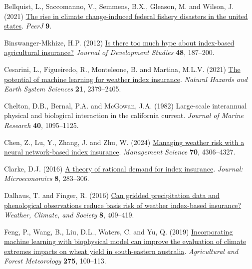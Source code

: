 \documentclass[
  letterpaper,
  DIV=11,
  numbers=noendperiod]{scrartcl}
\newlength{\cslhangindent}
\newlength{\cslentryspacingunit} %
\newenvironment{CSLReferences}[2] %
 {%
  \setlength{\parindent}{0pt}
  \ifodd #1
  \let\oldpar\par
  \def\par{\hangindent=\cslhangindent\oldpar}
  \fi
  \setlength{\parskip}{#2\cslentryspacingunit}
 }%
 {}
\begin{document}
\hypertarget{refs}{}
\begin{CSLReferences}{1}{0}
\leavevmode{}%
Bellquist, L., Saccomanno, V., Semmens, B.X., Gleason, M. and Wilson, J.
(2021) \href{https://doi.org/10.7717/peerj.11186}{The rise in climate
change-induced federal fishery disasters in the united states}.
\emph{PeerJ} \textbf{9}.

\leavevmode{}%
Binswanger-Mkhize, H.P. (2012)
\href{https://doi.org/10.1080/00220388.2011.625411}{Is there too much
hype about index-based agricultural insurance?} \emph{Journal of
Development Studies} \textbf{48}, 187--200.

\leavevmode{}%
Cesarini, L., Figueiredo, R., Monteleone, B. and Martina, M.L.V. (2021)
\href{https://doi.org/10.5194/nhess-21-2379-2021}{The potential of
machine learning for weather index insurance}. \emph{Natural Hazards and
Earth System Sciences} \textbf{21}, 2379--2405.

\leavevmode{}%
Chelton, D.B., Bernal, P.A. and McGowan, J.A. (1982) Large-scale
interannual physical and biological interaction in the california
current. \emph{Journal of Marine Research} \textbf{40}, 1095--1125.

\leavevmode{}%
Chen, Z., Lu, Y., Zhang, J. and Zhu, W. (2024)
\href{https://doi.org/10.1287/mnsc.2023.4902}{Managing weather risk with
a neural network-based index insurance}. \emph{Management Science}
\textbf{70}, 4306--4327.

\leavevmode{}%
Clarke, D.J. (2016) \href{https://doi.org/10.1257/mic.20140103}{A theory
of rational demand for index insurance}. \emph{Journal: Microeconomics}
\textbf{8}, 283--306.

\leavevmode{}%
Dalhaus, T. and Finger, R. (2016)
\href{https://doi.org/10.1175/WCAS-D-16-0020.1}{Can gridded
precipitation data and phenological observations reduce basis risk of
weather index-based insurance?} \emph{Weather, Climate, and Society}
\textbf{8}, 409--419.

\leavevmode{}%
Feng, P., Wang, B., Liu, D.L., Waters, C. and Yu, Q. (2019)
\href{https://doi.org/10.1016/j.agrformet.2019.05.018}{Incorporating
machine learning with biophysical model can improve the evaluation of
climate extremes impacts on wheat yield in south-eastern australia}.
\emph{Agricultural and Forest Meteorology} \textbf{275}, 100--113.


\end{CSLReferences}
\end{document}
